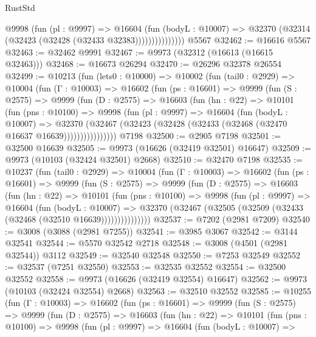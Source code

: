 \begin{lexlean}{RustStd}
\begin{coremodule}
                    @9998
                      (fun (pl : @9997) =>
                      @16604
                        (fun (bodyL : @10007) =>
                        @32370 (@32314 (@32423 (@32428 (@32433 @32383)))))))))))))))
    @5567
@32462 := @16616 @5567
@32463 := @32462 @9991
@32467 := @9973 (@32312 (@16613 (@16615 @32463)))
@32468 := @16673 @26294
@32470 := @26296 @32378 @26554
@32499 := @10213
    (fun (lets0 : @10000) =>
    @10002
      (fun (tail0 : @2929) =>
      @10004
        (fun (Γ : @10003) =>
        @16602
          (fun (ps : @16601) =>
          @9999
            (fun (S : @2575) =>
            @9999
              (fun (D : @2575) =>
              @16603
                (fun (hn : @22) =>
                @10101
                  (fun (pns : @10100) =>
                  @9998
                    (fun (pl : @9997) =>
                    @16604
                      (fun (bodyL : @10007) =>
                      @32370
                        (@32467
                          (@32423 (@32428 (@32433 (@32468 (@32470 @16637 @16639))))))))))))))))
    @7198
@32500 := @2905 @7198
@32501 := @32500 @16639
@32505 := @9973 (@16626 (@32419 @32501) @16647)
@32509 := @9973 (@10103 (@32424 @32501) @2668)
@32510 := @32470 @7198
@32535 := @10237
    (fun (tail0 : @2929) =>
    @10004
      (fun (Γ : @10003) =>
      @16602
        (fun (ps : @16601) =>
        @9999
          (fun (S : @2575) =>
          @9999
            (fun (D : @2575) =>
            @16603
              (fun (hn : @22) =>
              @10101
                (fun (pns : @10100) =>
                @9998
                  (fun (pl : @9997) =>
                  @16604
                    (fun (bodyL : @10007) =>
                    @32370 (@32467 (@32505 (@32509 (@32433 (@32468 (@32510 @16639)))))))))))))))
@32537 := @7202 (@2981 @7209)
@32540 := @3008 (@3088 (@2981 @7255))
@32541 := @3985 @3067
@32542 := @3144 @32541
@32544 := @5570 @32542 @2718
@32548 := @3008 (@4501 (@2981 @32544)) @3112
@32549 := @32540 @32548
@32550 := @7253 @32549
@32552 := @32537 (@7251 @32550)
@32553 := @32535 @32552
@32554 := @32500 @32552
@32558 := @9973 (@16626 (@32419 @32554) @16647)
@32562 := @9973 (@10103 (@32424 @32554) @2668)
@32563 := @32510 @32552
@32585 := @10255
    (fun (Γ : @10003) =>
    @16602
      (fun (ps : @16601) =>
      @9999
        (fun (S : @2575) =>
        @9999
          (fun (D : @2575) =>
          @16603
            (fun (hn : @22) =>
            @10101
              (fun (pns : @10100) =>
              @9998
                (fun (pl : @9997) =>
                @16604
                  (fun (bodyL : @10007) =>

\end{coremodule}
\end{lexlean}

